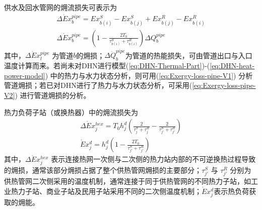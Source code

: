 供水及回水管网的㶲流损失可表示为
\begin{subequations}
\label{eq:Exergy-loss-pipe}
\begin{gather}
\Delta \dot Ex_b^{pipe} = Ex_{b(i)}^S - Ex_{b(j)}^S + Ex_{b(j)}^R - Ex_{b(i)}^R \label{eq:Exergy-loss-pipe-V1}\\
\Delta \dot Ex_b^{pipe} = ({1 - \frac{{2{T_0}}}{{\tau_{b(i)}^S + \tau_{b(i)}^R}}})\Delta Q_b^{pipe} \label{eq:Exergy-loss-pipe-V2}
\end{gather}
\end{subequations}
其中，$\Delta \dot Ex_l^{pipe}$ 为管道$b$的㶲损；$\Delta \dot Q_b^{pipe}$为管道的热能损失，可由管道出口与入口温度计算而来。若尚未对DHN进行模型(\ref{eq:DHN-Thermal-Part})-(\ref{eq:DHN-heat-power-model}) 中的热力与水力状态分析，则可用(\ref{eq:Exergy-loss-pipe-V1}) 分析管道㶲损；若已对DHN进行了热力与水力状态分析，可采用(\ref{eq:Exergy-loss-pipe-V2}) 进行管道㶲损的分析。

热力负荷子站（或换热器）中的㶲流损失为
\begin{subequations}
\label{eq:Exergy-loss-heat-exchanger}
\begin{gather}
\Delta \dot Ex_j^{hex} = {T_0}h_j^d({\frac{2}{{\tau_j^S + \tau_j^R}} - \frac{2}{{\tau_{j'}^S + \tau_{j'}^R}}})\\
\dot Ex_j^d = h_j^d({1 - \frac{{2{T_0}}}{{\tau_{j'}^S + \tau_{j'}^R}}})
\end{gather}
\end{subequations}
其中，$\Delta \dot Ex_j^{hex}$ 表示连接热网一次侧与二次侧的热力站内部的不可逆换热过程导致的㶲损，通常该部分㶲损占据了整个供热管网㶲损的主要部分；$\tau_{j'}^S$ 与 $\tau_{j'}^R$ 分别为供热管网二次侧采用的温度机制，通常连接于同于供热管网的不同热力子站，如工业热力子站、商业子站及民用子站采用不同的二次侧温度机制；$\dot Ex_j^d$表示热负荷获取的㶲能。

%

